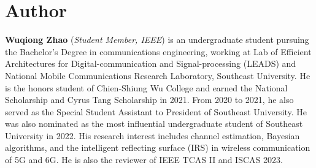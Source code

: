 \section{Author}
\textbf{Wuqiong Zhao} (\textit{Student Member, IEEE})
is an undergraduate student pursuing the Bachelor's Degree in communications engineering, working at Lab of Efficient Architectures for Digital-communication and Signal-processing (LEADS) and National Mobile Communications Research Laboratory, Southeast University.
He is the honors student of Chien-Shiung Wu College
and earned the National Scholarship and Cyrus Tang Scholarship in 2021.
From 2020 to 2021, he also served as the Special Student Assistant to President of Southeast University.
He was also nominated as the most influential undergraduate student of Southeast University in 2022.
His research interest includes channel estimation, Bayesian algorithms, and the intelligent reflecting surface (IRS) in wireless communication of 5G and 6G.
He is also the reviewer of IEEE TCAS II and ISCAS 2023.
